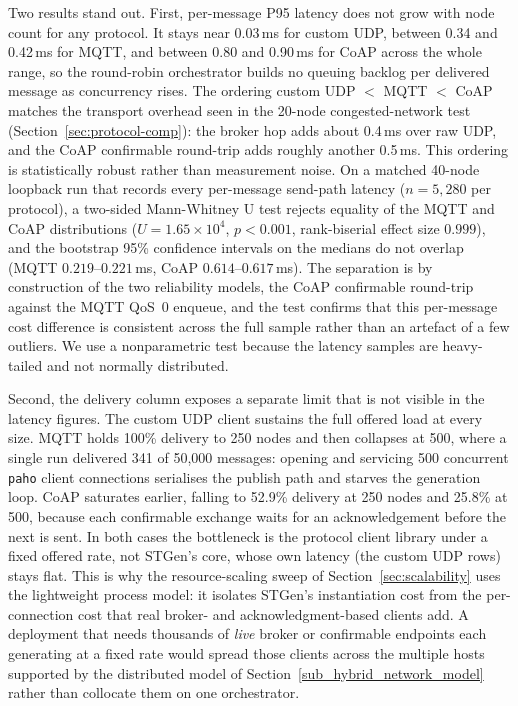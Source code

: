 \documentclass[jsan,article,submit,moreauthors,pdftex]{Definitions/mdpi}
\begin{document}
Two results stand out. First, per-message P95 latency does not grow with node count for any protocol. It stays near 0.03\,ms for custom UDP, between 0.34 and 0.42\,ms for MQTT, and between 0.80 and 0.90\,ms for CoAP across the whole range, so the round-robin orchestrator builds no queuing backlog per delivered message as concurrency rises. The ordering custom UDP $<$ MQTT $<$ CoAP matches the transport overhead seen in the 20-node congested-network test (Section~\ref{sec:protocol-comp}): the broker hop adds about 0.4\,ms over raw UDP, and the CoAP confirmable round-trip adds roughly another 0.5\,ms. This ordering is statistically robust rather than measurement noise. On a matched 40-node loopback run that records every per-message send-path latency ($n=5{,}280$ per protocol), a two-sided Mann-Whitney U test rejects equality of the MQTT and CoAP distributions ($U=1.65\times10^{4}$, $p<0.001$, rank-biserial effect size $0.999$), and the bootstrap 95\% confidence intervals on the medians do not overlap (MQTT $0.219$--$0.221$\,ms, CoAP $0.614$--$0.617$\,ms). The separation is by construction of the two reliability models, the CoAP confirmable round-trip against the MQTT QoS~0 enqueue, and the test confirms that this per-message cost difference is consistent across the full sample rather than an artefact of a few outliers. We use a nonparametric test because the latency samples are heavy-tailed and not normally distributed.

Second, the delivery column exposes a separate limit that is not visible in the latency figures. The custom UDP client sustains the full offered load at every size. MQTT holds 100\% delivery to 250 nodes and then collapses at 500, where a single run delivered 341 of 50{,}000 messages: opening and servicing 500 concurrent \texttt{paho} client connections serialises the publish path and starves the generation loop. CoAP saturates earlier, falling to 52.9\% delivery at 250 nodes and 25.8\% at 500, because each confirmable exchange waits for an acknowledgement before the next is sent. In both cases the bottleneck is the protocol client library under a fixed offered rate, not STGen's core, whose own latency (the custom UDP rows) stays flat. This is why the resource-scaling sweep of Section~\ref{sec:scalability} uses the lightweight process model: it isolates STGen's instantiation cost from the per-connection cost that real broker- and acknowledgment-based clients add. A deployment that needs thousands of \emph{live} broker or confirmable endpoints each generating at a fixed rate would spread those clients across the multiple hosts supported by the distributed model of Section~\ref{sub_hybrid_network_model} rather than collocate them on one orchestrator.
\end{document}
